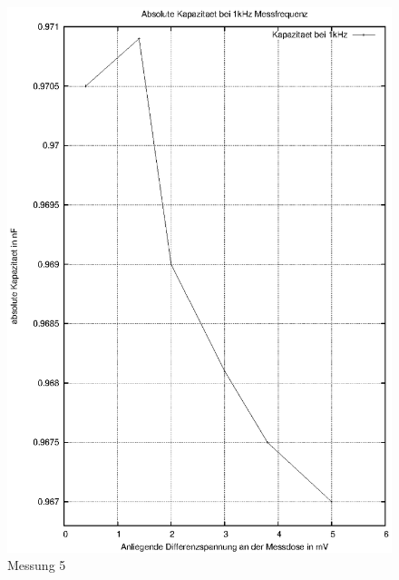 \documentclass[11pt]{scrreprt} %
\begin{document}
\begin {figure}[htbp]
      \begin{center}
        \includegraphics{tabelle2_1_4}
      \end{center}
\caption{Messung 5}
\label{fig:2.4}
\end{figure}

\newpage
\end{document}
